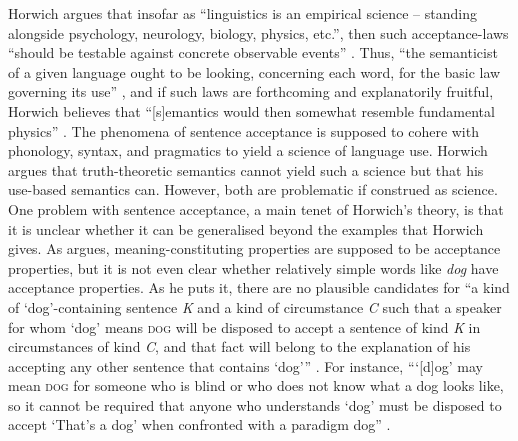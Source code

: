 Horwich argues that insofar as “linguistics is an empirical science – standing alongside psychology, neurology, biology, physics, etc.”, then such acceptance-laws “should be testable against concrete observable events” \citep[315]{Horwich2008}. Thus, “the semanticist of a given language ought to be looking, concerning each word, for the basic law governing its use” \citep[319]{Horwich2008}, and if such laws are forthcoming and explanatorily fruitful, Horwich believes that “[s]emantics would then somewhat resemble fundamental physics” \citep[318]{Horwich2008}. The phenomena of sentence acceptance is supposed to cohere with phonology, syntax, and pragmatics to yield a science of language use. Horwich argues that truth-theoretic semantics cannot yield such a science but that his use-based semantics can. However, both are problematic if construed as science. One problem with sentence acceptance, a main tenet of Horwich’s theory, is that it is unclear whether it can be generalised beyond the examples that Horwich gives. As \citet{Schiffer2000} argues, meaning-constituting properties are supposed to be acceptance properties, but it is not even clear whether relatively simple words like \textit{dog} have acceptance properties. As he puts it, there are no plausible candidates for “a kind of ‘dog’-containing sentence \textit{K} and a kind of circumstance \textit{C} such that a speaker for whom ‘dog’ means \textsc{dog} will be disposed to accept a sentence of kind \textit{K} in circumstances of kind \textit{C}, and that fact will belong to the explanation of his accepting any other sentence that contains ‘dog’” \citep[534]{Schiffer2000}. For instance, “‘[d]og’ may mean \textsc{dog} for someone who is blind or who does not know what a dog looks like, so it cannot be required that anyone who understands ‘dog’ must be disposed to accept ‘That’s a dog’ when confronted with a paradigm dog” \citep[534]{Schiffer2000}.

